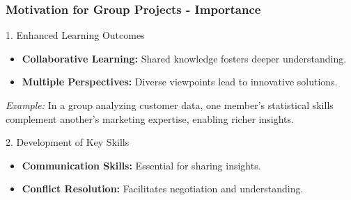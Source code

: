 \documentclass[aspectratio=169]{beamer}
\begin{document}
\begin{frame}[fragile]
    \frametitle{Motivation for Group Projects - Importance}
    \begin{block}{1. Enhanced Learning Outcomes}
        \begin{itemize}
            \item \textbf{Collaborative Learning:} Shared knowledge fosters deeper understanding.
            \item \textbf{Multiple Perspectives:} Diverse viewpoints lead to innovative solutions.
        \end{itemize}
        \textit{Example:} 
        In a group analyzing customer data, one member's statistical skills complement another’s marketing expertise, enabling richer insights.
    \end{block}

    \begin{block}{2. Development of Key Skills}
        \begin{itemize}
            \item \textbf{Communication Skills:} Essential for sharing insights.
            \item \textbf{Conflict Resolution:} Facilitates negotiation and understanding.
        \end{itemize}
    \end{block}
\end{frame}
\end{document}
